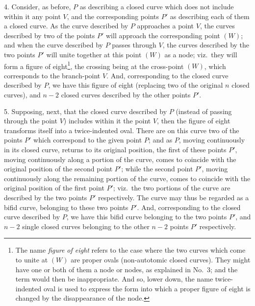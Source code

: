 \documentclass[11pt,a4paper]{article}
\begin{document}
\newpage


4. Consider, as before, $P$ as describing a closed curve which does not include within it any point $V$, and the corresponding points $P'$ as describing each of them a closed curve. As the curve described by $P$ approaches a point $V$, the curves described by two of the points $P'$ will approach the corresponding point $(W)$; and when the curve described by $P$ passes through $V$, the curves described by the two points $P'$ will unite together at this point $(W)$ as a node; viz.\ they will form a figure of eight\footnote{The name \emph{figure of eight} refers to the case where the two curves which come to unite at $(W)$ are proper ovals (non-autotomic closed curves). They might have one or both of them a node or nodes, as explained in No.~3; and the term would then be inappropriate. And so, lower down, the name twice-indented oval is used to express the form into which a proper figure of eight is changed by the disappearance of the node.}, the crossing being at the cross-point $(W)$, which corresponds to the branch-point $V$. And, corresponding to the closed curve described by $P$, we have this figure of eight (replacing two of the original $n$ closed curves), and $n - 2$ closed curves described by the other points $P'$.

\medskip

5. Supposing, next, that the closed curve described by $P$ (instead of passing through the point $V$) includes within it the point $V$, then the figure of eight transforms itself into a twice-indented oval. There are on this curve two of the points $P'$ which correspond to the given point $P$; and as $P$, moving continuously in its closed curve, returns to its original position, the first of these points $P'$, moving continuously along a portion of the curve, comes to coincide with the original position of the second point $P'$; while the second point $P'$, moving continuously along the remaining portion of the curve, comes to coincide with the original position of the first point $P'$; viz.\ the two portions of the curve are described by the two points $P'$ respectively. The curve may thus be regarded as a bifid curve, belonging to these two points $P'$. And, corresponding to the closed curve described by $P$, we have this bifid curve belonging to the two points $P'$, and $n - 2$ single closed curves belonging to the other $n - 2$ points $P'$ respectively.

\medskip
\end{document}
